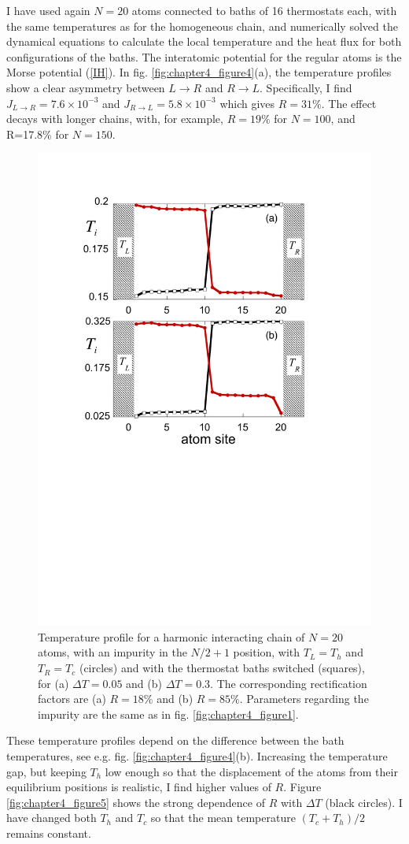 I have used again $N=20$ atoms connected to baths of 16 thermostats each, with the same temperatures as for the homogeneous chain, and numerically solved the dynamical equations
to calculate the local temperature and the heat flux for both configurations of the baths. The interatomic potential for the regular atoms is the Morse potential (\ref{IH}).
In fig. \ref{fig:chapter4_figure4}(a), the temperature profiles show a clear asymmetry between ${L\rightarrow R}$ and ${R\rightarrow L}$. Specifically, I find $J_{L\rightarrow R}=7.6 \times 10^{-3}$ and $J_{R\rightarrow L}=5.8 \times 10^{-3}$ which gives
$R=31\%$. The effect decays with longer chains,  with, for example, $R=19\%$ for $N=100$, and R=17.8\% for $N=150$.

\begin{figure}
\centering
\includegraphics[width=0.65\linewidth]{Figures/FIG6.pdf}
\caption{Temperature profile for a harmonic interacting chain of $N=20$ atoms, with an impurity in the $N/2+1$ position, with $T_L=T_h$ and $T_R=T_c$ (circles) and with the thermostat baths switched (squares), for (a) $\Delta T = 0.05$ and (b)  $\Delta T = 0.3$. The corresponding rectification factors are (a) $R=18\%$ and (b) $R=85\%$. Parameters regarding the impurity are the same as in fig. \ref{fig:chapter4_figure1}.
}
\label{fig:chapter4_figure6}
\end{figure}

These temperature profiles depend on the difference between the bath temperatures, see e.g. fig. \ref{fig:chapter4_figure4}(b). Increasing the temperature gap, but  keeping $T_h$ low enough so that the displacement of the atoms from their equilibrium positions is realistic, I find higher values of $R$. Figure \ref {fig:chapter4_figure5} shows the strong dependence of $R$ with $\Delta T$ (black circles). I have changed both $T_h$ and $T_c$ so that the mean temperature $(T_c+T_h)/2$ remains constant.

